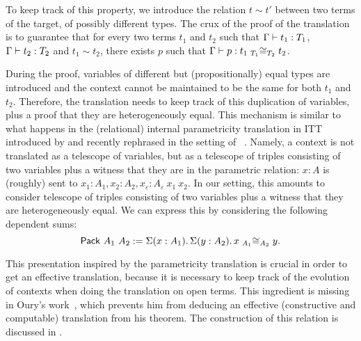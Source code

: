 To keep track of this property, we introduce the relation $t \sim t'$
between two terms of the target, of possibly different
types.
%
The crux of the proof of the translation is to guarantee that for
every two terms $t_1$ and $t_2$ such that $\isterm{\Ga}{t_1}{T_1}$,
$\isterm{\Ga}{t_2}{T_2}$ and $t_1 \sim t_2$, there exists $p$ such that
$\isterm{\Ga} {p} {\Heq{{T_1}} {{t_1}} {{T_2}} {{t_2}}}$.

During the proof, variables of different but (propositionally) equal
types are introduced and the context cannot be maintained to be the same
for both $t_1$ and $t_2$. Therefore, the translation needs to keep
track of this duplication of variables, plus a proof that they are
heterogeneously equal.
%
This mechanism is similar to what happens in the (relational) internal
parametricity translation in \acrshort{ITT} introduced by
 and recently rephrased in the setting of
\MetaCoq~. Namely, a context is not
translated as a telescope of variables, but as a telescope of triples
consisting of two variables plus a witness that they are in the
parametric relation: \(x : A\) is (roughly) sent to
\(x_1 : A_1, x_2 : A_2, x_\varepsilon : A_\varepsilon\ x_1\ x_2\).
%
In our setting, this amounts to consider telescope of triples
consisting of two variables plus a witness that they are
heterogeneously equal. We can express this by considering the
following dependent sums:
\[
\Pack{A_1}{A_2} := \Sum{x:A_1} \Sum{y:A_2} \Heq{A_1}{x}{A_2}{y}.
\]

This presentation inspired by the parametricity translation is crucial
in order to get an effective translation, because it is necessary to
keep track of the evolution of contexts when doing the translation on
open terms.
%
This ingredient is missing in Oury's work~,
which prevents him from deducing an effective (\ie constructive and
computable) translation from his theorem.
The construction of this relation is discussed in .